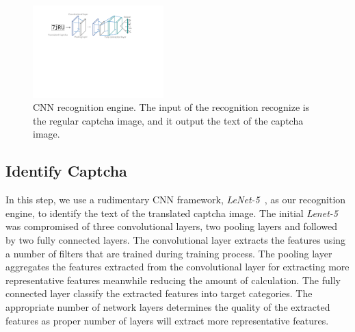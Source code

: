 %

\begin{figure}[!t]
  \centering
  \includegraphics[width=0.45\textwidth]{fig/cnn_model.pdf}
  \caption{CNN recognition engine. The input of the recognition recognize is the regular captcha image, and it output the text of the captcha image.}
  \label{fig: cnn_model}
\end{figure}

\subsection{Identify Captcha}
In this step, we use a rudimentary CNN framework, \emph{LeNet-5}~\cite{Lecun1998Gradient}, as our recognition engine, to identify the text of the translated captcha image.
The initial \emph{Lenet-5} was compromised of three convolutional layers, two pooling layers and followed by two fully connected layers.
The convolutional layer extracts the features using a number of filters that are trained during training process. The pooling layer aggregates the features extracted from the convolutional layer for extracting more representative features meanwhile reducing the amount of calculation. The fully connected layer classify the extracted features into target categories. The appropriate number of network layers determines the quality of the extracted features as proper number of layers will extract more representative features.

